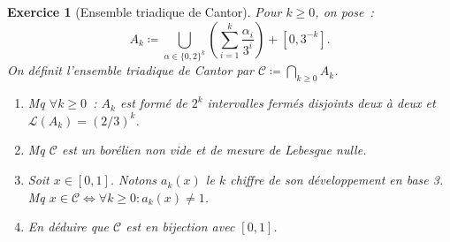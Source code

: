 \documentclass{article}
\newtheorem{ex}{Exercice}[section]
\begin{document}
\begin{ex}[Ensemble triadique de Cantor] Pour $k \geq 0$, on pose~:
\[A_k \coloneqq \bigcup_{\alpha \in \{0, 2\}^k}\left(\sum_{i=1}^k\frac {\alpha_i}{3^i}\right) + [0, 3^{-k}].\]
On définit l'\textit{ensemble triadique de Cantor} par $\mathscr C \coloneqq \bigcap_{k \geq 0}A_k$.
\begin{enumerate}
	\item Mq $\forall k \geq 0$~: $A_k$ est formé de $2^k$ intervalles fermés disjoints deux à deux et $\mathcal L(A_k) = (2/3)^k$.
	\item Mq $\mathscr C$ est un borélien non vide et de mesure de Lebesgue nulle.
	\item Soit $x \in [0, 1]$. Notons $a_k(x)$ le $k$ chiffre de son développement en base 3. Mq $x \in \mathscr C \iff \forall k \geq 0 : a_k(x) \neq 1$.
	\item En déduire que $\mathscr C$ est en bijection avec $[0, 1]$.
\end{enumerate}
\end{ex}
\end{document}
